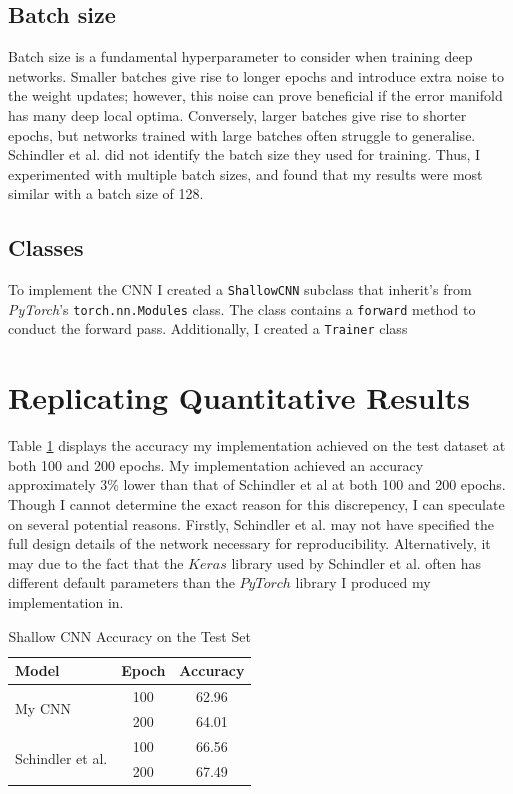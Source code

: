 \documentclass[conference]{IEEEtran}
\begin{document}
\subsection{Batch size}

Batch size is a fundamental hyperparameter to consider when training deep networks.
Smaller batches give rise to longer epochs and introduce extra noise to the weight updates; however, this noise can prove beneficial if the error manifold has many deep local optima.
Conversely, larger batches give rise to shorter epochs, but networks trained with large batches often struggle to generalise.
Schindler et al. did not identify the batch size they used for training.
Thus, I experimented with multiple batch sizes, and found that my results were most similar with a batch size of 128.

\subsection{Classes}

To implement the CNN I created a \texttt{ShallowCNN} subclass that inherit's from \textit{PyTorch}'s \texttt{torch.nn.Modules} class.
The class contains a \texttt{forward} method to conduct the forward pass.
Additionally, I created a \texttt{Trainer} class 

\section{Replicating Quantitative Results}

Table \ref{shallow_results} displays the accuracy my implementation achieved on the test dataset at both 100 and 200 epochs.
My implementation achieved an accuracy approximately 3\% lower than that of Schindler et al at both 100 and 200 epochs.
Though I cannot determine the exact reason for this discrepency, I can speculate on several potential reasons.
Firstly, Schindler et al. may not have specified the full design details of the network necessary for reproducibility.
Alternatively, it may due to the fact that the $Keras$ library used by Schindler et al. often has different default parameters than the $PyTorch$ library I produced my implementation in.

\begin{table}[htbp]
    \caption{Shallow CNN Accuracy on the Test Set}
    \begin{center}
    \begin{tabular}{l c c}
    \toprule
    \textbf{Model}&\textbf{Epoch}&\textbf{Accuracy}\\
    \midrule
    \multirow{ 2}{*}{My CNN} & 100 & 62.96 \\
    & 200 & 64.01 \\
    \midrule
    \multirow{ 2}{*}{Schindler et al.} & 100 & 66.56\\
    & 200 & 67.49 \\
    \bottomrule
    \end{tabular}
    \label{shallow_results}
    \end{center}
\end{table}
\end{document}
